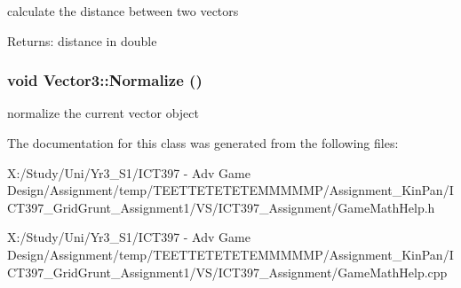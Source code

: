 calculate the distance between two vectors \begin{Desc}
\item[Returns:]distance in double \end{Desc}
\hypertarget{class_vector3_9c94cc16049543fc8edaba52c2b266b7}{
\subsubsection[Normalize]{\setlength{\rightskip}{0pt plus 5cm}void Vector3::Normalize ()}}
\label{class_vector3_9c94cc16049543fc8edaba52c2b266b7}


normalize the current vector object 

The documentation for this class was generated from the following files:\begin{CompactItemize}
\item 
X:/Study/Uni/Yr3\_\-S1/ICT397 - Adv Game Design/Assignment/temp/TEETTETETETEMMMMMP/Assignment\_\-KinPan/ICT397\_\-GridGrunt\_\-Assignment1/VS/ICT397\_\-Assignment/GameMathHelp.h\item 
X:/Study/Uni/Yr3\_\-S1/ICT397 - Adv Game Design/Assignment/temp/TEETTETETETEMMMMMP/Assignment\_\-KinPan/ICT397\_\-GridGrunt\_\-Assignment1/VS/ICT397\_\-Assignment/GameMathHelp.cpp\end{CompactItemize}
